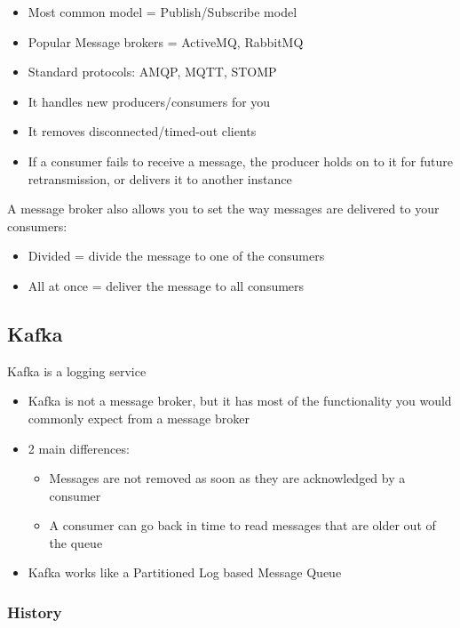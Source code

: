 \documentclass{article}
\begin{document}
\begin{itemize}
    \item Most common model = Publish/Subscribe model
    \item Popular Message brokers = ActiveMQ, RabbitMQ
    \item Standard protocols: AMQP, MQTT, STOMP
    \item It handles new producers/consumers for you
    \item It removes disconnected/timed-out clients
    \item If a consumer fails to receive a message, the producer holds on to it for future retransmission, or delivers it to another instance
\end{itemize}

A message broker also allows you to set the way messages are delivered to your consumers:

\begin{itemize}
    \item Divided = divide the message to one of the consumers
    \item All at once = deliver the message to all consumers 
\end{itemize}

\subsection{Kafka}

Kafka is a logging service

\begin{itemize}
    \item Kafka is not a message broker, but it has most of the functionality you would commonly expect from a message broker
    \item 2 main differences:
    \begin{itemize}
        \item Messages are not removed as soon as they are acknowledged by a consumer
        \item A consumer can go back in time to read messages that are older out of the queue
    \end{itemize}
    \item Kafka works like a Partitioned Log based Message Queue
\end{itemize}

\subsubsection{History}
\end{document}
